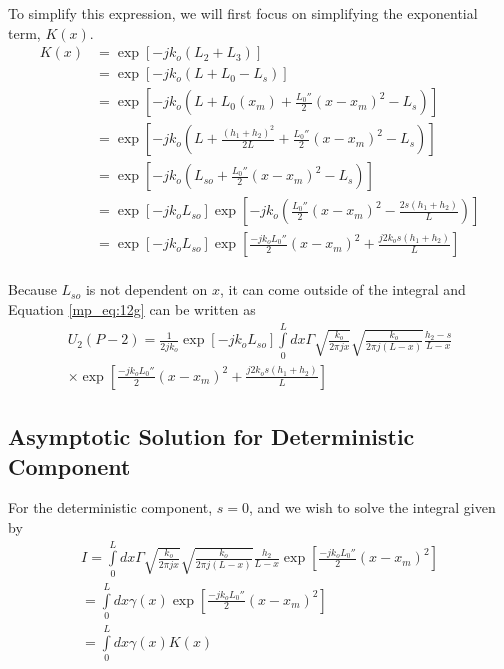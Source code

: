 To simplify this expression, we will first focus on simplifying the exponential term, $K(x)$.
\begin{equation}
\begin{aligned}
K(x)&= \exp\left[-jk_o\left( L_2 + L_3\right) \right] \\
&= \exp\left[-jk_o\left( L+L_0-L_s\right) \right]\\
&= \exp\left[-jk_o\left( L+L_0(x_m) + \frac{L_0''}{2}(x-x_m)^2-L_s\right) \right]\\
&= \exp\left[-jk_o\left( L+\frac{(h_1+h_2)^2}{2L} + \frac{L_0''}{2}(x-x_m)^2-L_s\right)\right]\\
&=\exp\left[-jk_o\left(L_{so}+\frac{L_0''}{2}(x-x_m)^2-L_s\right)\right]\\
&=\exp\left[-jk_oL_{so}\right]\exp\left[-jk_o\left(\frac{L_0''}{2}(x-x_m)^2-\frac{2s(h_1+h_2)}{L}\right)\right]\\
&=\exp\left[-jk_oL_{so}\right]\exp\left[\frac{-jk_oL_0''}{2}(x-x_m)^2+\frac{j2k_os(h_1+h_2)}{L}\right]\\
\label{mp_eq:12i}
\end{aligned}
\end{equation}
\renewcommand{\baselinestretch}{2} \small\normalsize

Because $L_{so}$ is not dependent on $x$, it can come outside of the integral and Equation \ref{mp_eq:12g} can be written as
\begin{equation}
\begin{gathered}
U_2(P-2)= \frac{1}{2jk_o}\exp\left[-jk_oL_{so}\right]\int\limits_{0}^{L}dx\Gamma \sqrt{\frac{k_o}{2\pi jx}}\sqrt{\frac{k_o}{2\pi j (L-x)}}\frac{h_2-s}{L-x}\\ \times\exp\left[\frac{-jk_oL_0''}{2}(x-x_m)^2+\frac{j2k_os(h_1+h_2)}{L}\right]
\label{mp_eq:21}
\end{gathered}
\end{equation}
\renewcommand{\baselinestretch}{2} \small\normalsize

\subsection{Asymptotic Solution for Deterministic Component}
For the deterministic component, $s = 0$, and we wish to solve the integral given by
\begin{equation}
\begin{gathered}
I = \int\limits_{0}^{L}dx\Gamma \sqrt{\frac{k_o}{2\pi jx}}\sqrt{\frac{k_o}{2\pi j (L-x)}}\frac{h_2}{L-x}\exp\left[\frac{-jk_oL_0''}{2}(x-x_m)^2\right] \\
= \int\limits_{0}^{L}dx\gamma(x)\exp\left[\frac{-jk_oL_0''}{2}(x-x_m)^2\right] \\
= \int\limits_{0}^{L}dx\gamma(x)K(x) 
\end{gathered}
\label{mp_eq:22}
\end{equation}

